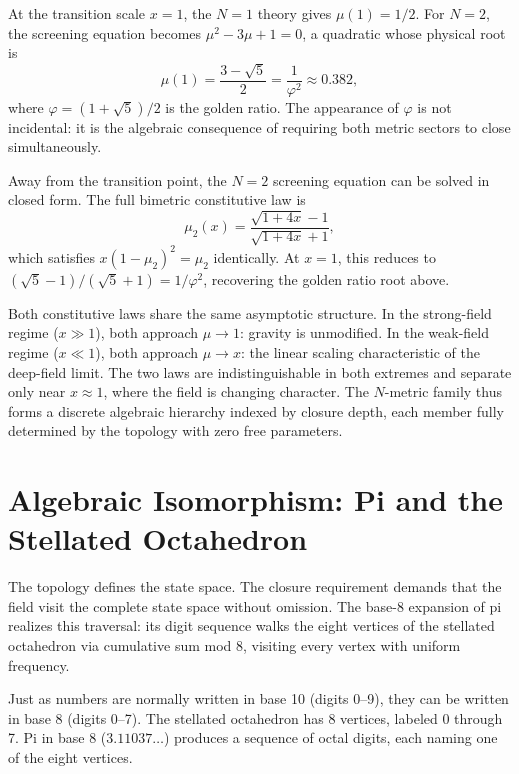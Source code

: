 \documentclass[twocolumn]{iopjournal}
\begin{document}
At the transition scale $x = 1$, the $N = 1$ theory gives $\mu(1) = 1/2$. For $N = 2$, the screening equation becomes $\mu^2 - 3\mu + 1 = 0$, a quadratic whose physical root is
\begin{equation}
\mu(1) = \frac{3 - \sqrt{5}}{2} = \frac{1}{\varphi^2} \approx 0.382,
\end{equation}
where $\varphi = (1 + \sqrt{5})/2$ is the golden ratio. The appearance of $\varphi$ is not incidental: it is the algebraic consequence of requiring both metric sectors to close simultaneously.

Away from the transition point, the $N = 2$ screening equation can be solved in closed form. The full bimetric constitutive law is
\begin{equation}
\mu_2(x) = \frac{\sqrt{1 + 4x} - 1}{\sqrt{1 + 4x} + 1},
\label{eq:mu2}
\end{equation}
which satisfies $x(1 - \mu_2)^2 = \mu_2$ identically. At $x = 1$, this reduces to $({\sqrt{5} - 1})/({\sqrt{5} + 1}) = 1/\varphi^2$, recovering the golden ratio root above.

Both constitutive laws share the same asymptotic structure. In the strong-field regime ($x \gg 1$), both approach $\mu \to 1$: gravity is unmodified. In the weak-field regime ($x \ll 1$), both approach $\mu \to x$: the linear scaling characteristic of the deep-field limit. The two laws are indistinguishable in both extremes and separate only near $x \approx 1$, where the field is changing character. The $N$-metric family thus forms a discrete algebraic hierarchy indexed by closure depth, each member fully determined by the topology with zero free parameters.


\section{Algebraic Isomorphism: Pi and the Stellated Octahedron}
\label{sec:pi}

The topology defines the state space. The closure requirement demands that the field visit the complete state space without omission. The base-8 expansion of pi realizes this traversal: its digit sequence walks the eight vertices of the stellated octahedron via cumulative sum mod 8, visiting every vertex with uniform frequency.

Just as numbers are normally written in base 10 (digits 0--9), they can be written in base 8 (digits 0--7). The stellated octahedron has 8 vertices, labeled 0 through 7. Pi in base 8 ($3.11037\ldots$) produces a sequence of octal digits, each naming one of the eight vertices.
\end{document}
